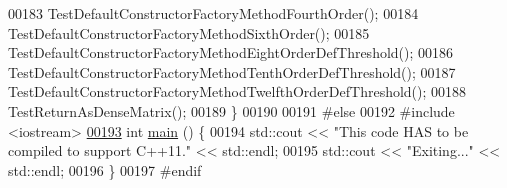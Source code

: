 \begin{DoxyCode}
00183   TestDefaultConstructorFactoryMethodFourthOrder();
00184   TestDefaultConstructorFactoryMethodSixthOrder();
00185   TestDefaultConstructorFactoryMethodEightOrderDefThreshold();
00186   TestDefaultConstructorFactoryMethodTenthOrderDefThreshold();
00187   TestDefaultConstructorFactoryMethodTwelfthOrderDefThreshold();
00188   TestReturnAsDenseMatrix();
00189 \}
00190 
00191 \textcolor{preprocessor}{#else}
00192 \textcolor{preprocessor}{#include <iostream>}
\hypertarget{mtk__lap__1d__test_8cc_source_l00193}{}\hyperlink{mtk__lap__1d__test_8cc_ae66f6b31b5ad750f1fe042a706a4e3d4}{00193} \textcolor{keywordtype}{int} \hyperlink{mtk__lap__1d__test_8cc_ae66f6b31b5ad750f1fe042a706a4e3d4}{main} () \{
00194   std::cout << \textcolor{stringliteral}{"This code HAS to be compiled to support C++11."} << std::endl;
00195   std::cout << \textcolor{stringliteral}{"Exiting..."} << std::endl;
00196 \}
00197 \textcolor{preprocessor}{#endif}
\end{DoxyCode}
